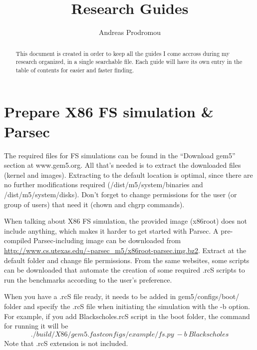 \documentclass[a4paper,12pt]{article}
\begin{document}
\title{Research Guides}
\author{Andreas Prodromou}
\maketitle
\tableofcontents
\clearpage

\renewcommand{\abstractname}{Introduction -- Explanation}
\begin{abstract}
This document is created in order to keep all the guides I come accross during my research organized, in a single searchable file. Each guide will have its own entry in the table of contents for easier and faster finding.
\end{abstract}

\section{Prepare X86 FS simulation \& Parsec}
The required files for FS simulations can be found in the ``Download gem5'' section at www.gem5.org. All that's needed is to extract the downloaded files (kernel and images). Extracting to the default location is optimal, since there are no further modifications required (/dist/m5/system/binaries and /dist/m5/system/disks). Don't forget to change permissions for the user (or group of users) that need it (chown and chgrp commands). 

When talking about X86 FS simulation, the provided image (x86root) does not include anything, which makes it harder to get started with Parsec. A pre-compiled Parsec-including image can be downloaded from \url{http://www.cs.utexas.edu/~parsec_m5/x86root-parsec.img.bz2}. Extract at the default folder and change file permissions. From the same websites, some scripts can be downloaded that automate the creation of some required .rcS scripts to run the benchmarks according to the user's preference.

When you have a .rcS file ready, it needs to be added in gem5/configs/boot/ folder and specify the .rcS file when initiating the simulation with the -b option. For example, if you add Blackscholes.rcS script in the boot folder, the command for running it will be $$./build/X86/gem5.fast configs/example/fs.py\ -b\ Blackscholes$$ Note that .rcS extension is not included.
\end{document}
